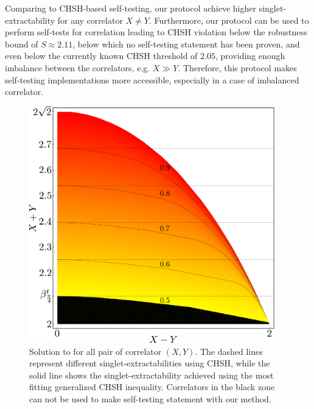 Comparing to CHSH-based self-testing, our protocol achieve higher singlet-extractability for any correlator $X\neq Y$.
Furthermore, our protocol can be used to perform self-tests for correlation leading to CHSH violation below the robustness bound of $S\approx 2.11$, below which no self-testing statement has been proven, and even below the currently known CHSH threshold of $2.05$, providing enough imbalance between the correlators, e.g. $X \gg Y$.
Therefore, this protocol makes self-testing implementations more accessible, especially in a case of imbalanced correlator.

\begin{figure}
	\begin{center}
		\includegraphics[width=0.95\textwidth]{chapters/selftesting/img/generalizedCHSH.pdf}
	\end{center}
	\caption{Solution to  for all pair of correlator $(X,Y)$. The dashed lines represent different singlet-extractabilities using CHSH, while the solid line shows the singlet-extractability achieved using the most fitting generalized CHSH inequality. Correlators in the black zone can not be used to make self-testing statement with our method.}
	\label{fig:generalizedCHSHfid}
\end{figure}

